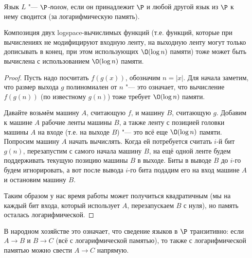 	\begin{Def}
		Язык $L$ "--- \textit{$\P$-полон}, если он принадлежит $\P$ и любой другой язык из $\P$
		к нему сводится (за логарифмическую память).
	\end{Def}

	\begin{lemma}
		Композиция двух logspace-вычислимых функций (т.е. функций, которые при вычислениях не модифицируют входную ленту, на выходную ленту могут только дописывать в конец, при этом
		использующих $\O(\log n)$ памяти) тоже может быть вычислена с использованием $\O(\log n)$ памяти.
	\end{lemma}
	\begin{proof}
		Пусть надо посчитать $f(g(x))$, обозначим $n=|x|$.
		Для начала заметим, что размер выхода $g$ полиномиален от $n$ "--- это означает, что вычисление $f(g(n))$
		(по известному $g(n)$) тоже требует $\O(\log n)$ памяти.

		Давайте возьмём машину $A$, считающую $f$, и машину $B$, считающую $g$.
		Добавим к машине $A$ рабочие ленты машины $B$, а также ленту с позицией головки машины $A$ на входе (т.е. на выходе $B$) "--- это всё еще $\O(\log n)$ памяти.
		Попросим машину $A$ начать вычислять.
		Когда ей потребуется считать $i$-й бит $g(n)$, перезапустим с самого начала машину $B$, на ещё одной ленте будем поддерживать
		текущую позицию машины $B$ в выходе.
		Биты в выводе $B$ до $i$-го будем игнорировать, а вот после вывода $i$-го бита подадим его на вход машине $A$ и остановим машину $B$.

		Таким образом у нас время работы может получиться квадратичным (мы на каждый бит входа, который использует $A$, перезапускаем $B$ с нуля),
		но память осталась логарифмической.
	\end{proof}
	\begin{Rem}
		В народном хозяйстве это означает, что сведение языков в $\P$ транзитивно: если $A \to B$ и $B \to C$ (всё с логарифмической памятью),
		то также с логарифмической памятью можно свести $A \to C$ напрямую.
	\end{Rem}

